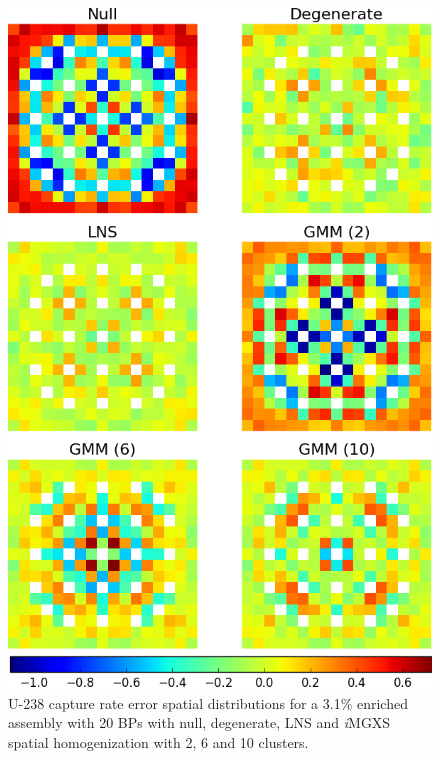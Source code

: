 \begin{figure}[h!]
\centering
\includegraphics[width=0.9\linewidth]{figures/results/spatial/assm-31-20BPs/capt-err}
\vspace{2mm}
\caption[U-238 capture rate errors for a 3.1\% enriched assembly with 20 BPs]{U-238 capture rate error spatial distributions for a 3.1\% enriched assembly with 20 \acp{BP} with null, degenerate, \ac{LNS} and \textit{i}\ac{MGXS} spatial homogenization with 2, 6 and 10 clusters.}
\label{fig:chap11-assm-3.1-20BPs-capt-rates}
\end{figure}

\clearpage

